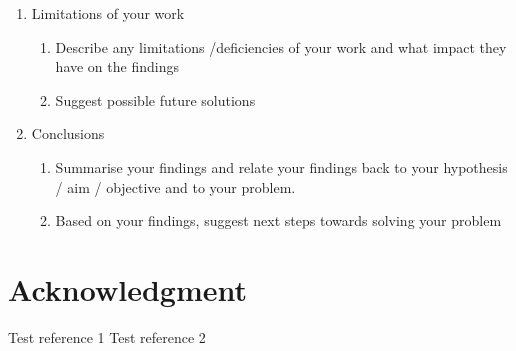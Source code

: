 \documentclass[conference]{IEEEtran}
\begin{document}
{\begin{enumerate}
\begin{enumerate}
	\end{enumerate}
\item Limitations of your work
	\begin{enumerate}
	\item Describe any limitations /deficiencies of your work and what impact they have on the findings
	\item Suggest possible future solutions
	\end{enumerate}
\item Conclusions
	\begin{enumerate}
	\item Summarise your findings and relate your findings back to your hypothesis / aim / objective and to your problem.
	\item Based on your findings, suggest next steps towards solving your problem
	\end{enumerate}
\end{enumerate} 
}

\section*{Acknowledgment}

\pagebreak
\begin{thebibliography}{00}
     Test reference 1
     Test reference 2
\end{thebibliography}
\end{document}
